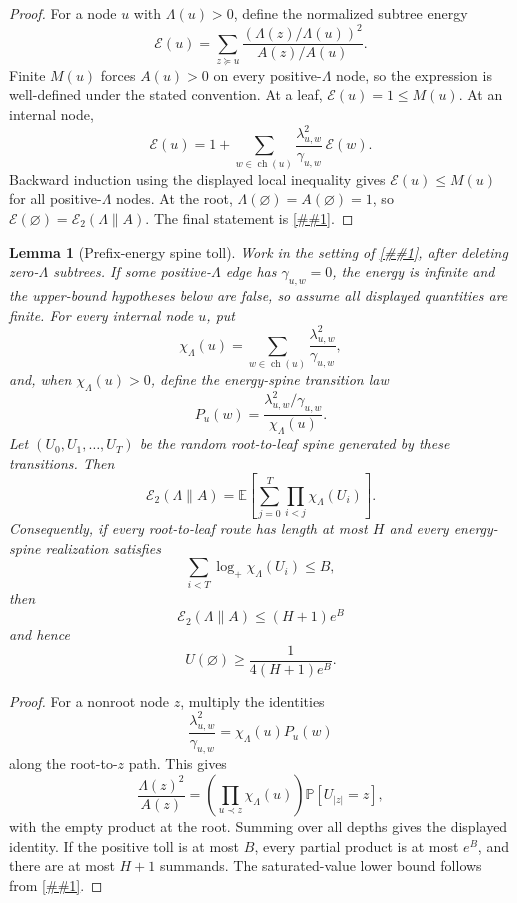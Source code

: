\documentclass[10pt]{article}
\newcommand{\cref}[1]{\ref{##1}}
\newtheorem{lemma}[theorem]{Lemma}
\theoremstyle{definition}
\newcommand{\E}{\mathbb{E}}
\newcommand{\Prb}{\mathbb{P}}
\begin{document}
\begin{proof}
   For a node $u$ with $\Lambda(u)>0$, define the normalized subtree energy
   \[
      \mathcal E(u)
      =
      \sum_{z\succeq u}
      \frac{(\Lambda(z)/\Lambda(u))^2}{A(z)/A(u)} .
   \]
   Finite $M(u)$ forces $A(u)>0$ on every positive-$\Lambda$ node, so the
   expression is well-defined under the stated convention. At a leaf,
   $\mathcal E(u)=1\le M(u)$. At an internal node,
   \[
      \mathcal E(u)
      =
      1+
      \sum_{w\in\operatorname{ch}(u)}
      \frac{\lambda_{u,w}^2}{\gamma_{u,w}}\,\mathcal E(w).
   \]
   Backward induction using the displayed local inequality gives
   $\mathcal E(u)\le M(u)$ for all positive-$\Lambda$ nodes. At the root,
   $\Lambda(\varnothing)=A(\varnothing)=1$, so
   $\mathcal E(\varnothing)=\mathcal E_2(\Lambda\|A)$. The final statement is
   \cref{cor:route-law-prefix-energy}.
\end{proof}

\begin{lemma}[Prefix-energy spine toll]\label{lem:prefix-energy-spine-toll}
   Work in the setting of \cref{lem:local-prefix-energy}, after deleting
   zero-$\Lambda$ subtrees. If some positive-$\Lambda$ edge has
   $\gamma_{u,w}=0$, the energy is infinite and the upper-bound hypotheses
   below are false, so assume all displayed quantities are finite. For every
   internal node $u$, put
   \[
      \chi_\Lambda(u)=
      \sum_{w\in\operatorname{ch}(u)}
      \frac{\lambda_{u,w}^2}{\gamma_{u,w}},
   \]
   and, when $\chi_\Lambda(u)>0$, define the energy-spine transition law
   \[
      P_u(w)=
      \frac{\lambda_{u,w}^2/\gamma_{u,w}}{\chi_\Lambda(u)} .
   \]
   Let $(U_0,U_1,\ldots,U_T)$ be the random root-to-leaf spine generated by
   these transitions. Then
   \[
      \mathcal E_2(\Lambda\|A)
      =
      \E\left[
         \sum_{j=0}^{T}
         \prod_{i<j}\chi_\Lambda(U_i)
      \right].
   \]
   Consequently, if every root-to-leaf route has length at most $H$ and every
   energy-spine realization satisfies
   \[
      \sum_{i<T}\log_+\chi_\Lambda(U_i)\le B,
   \]
   then
   \[
      \mathcal E_2(\Lambda\|A)\le(H+1)e^B
   \]
   and hence
   \[
      U(\varnothing)\ge \frac{1}{4(H+1)e^B}.
   \]
\end{lemma}

\begin{proof}
   For a nonroot node $z$, multiply the identities
   \[
      \frac{\lambda_{u,w}^2}{\gamma_{u,w}}
      =
      \chi_\Lambda(u)P_u(w)
   \]
   along the root-to-$z$ path. This gives
   \[
      \frac{\Lambda(z)^2}{A(z)}
      =
      \left(\prod_{u\prec z}\chi_\Lambda(u)\right)
      \Prb[U_{|z|}=z],
   \]
   with the empty product at the root. Summing over all depths gives the
   displayed identity. If the positive toll is at most $B$, every partial
   product is at most $e^B$, and there are at most $H+1$ summands. The
   saturated-value lower bound follows from
   \cref{cor:route-law-prefix-energy}.
\end{proof}
\end{document}
